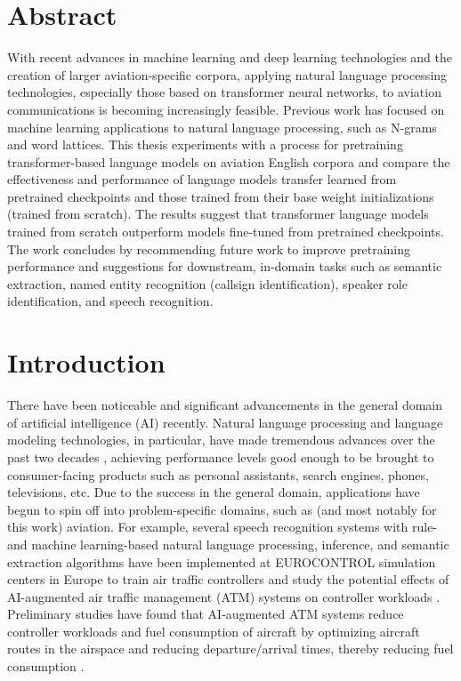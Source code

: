 \documentclass[12pt]{article}
\begin{document}
\section{Abstract}\label{sec:abstract}
With recent advances in machine learning and deep learning technologies and the creation of larger aviation-specific corpora, applying
natural language processing technologies, especially those based on transformer neural networks, to aviation communications is becoming
increasingly feasible. Previous work has focused on machine learning applications to natural language processing, such as N-grams and
word lattices. This thesis experiments with a process for pretraining transformer-based language models on aviation English corpora and
compare the effectiveness and performance of language models transfer learned from pretrained checkpoints and those trained from their
base weight initializations (trained from scratch). The results suggest that transformer language models trained from scratch outperform
models fine-tuned from pretrained checkpoints. The work concludes by recommending future work to improve pretraining performance and
suggestions for downstream, in-domain tasks such as semantic extraction, named entity recognition (callsign identification), speaker
role identification, and speech recognition.

\section{Introduction}\label{sec:introduction}
There have been noticeable and significant advancements in the general domain of artificial intelligence (AI) recently. Natural
language processing and language modeling technologies, in particular, have made tremendous advances over the past two decades
\cite{hannun_deep_2014,lee_unsupervised_2009,li_jasper_2019,kriman_quartznet_2020}, achieving performance levels good enough to be brought to
consumer-facing products such as personal assistants, search engines, phones, televisions, etc. Due to the success in the general domain, applications
have begun to spin off into problem-specific domains, such as (and most notably for this work) aviation. For example, several speech recognition
systems with rule- and machine learning-based natural language processing, inference, and semantic extraction algorithms have been implemented at
EUROCONTROL simulation centers in Europe to train air traffic controllers and study the potential effects of AI-augmented air traffic management (ATM)
systems on controller workloads \cite{helmke_quantifying_2017,helmke_assistant-based_2015}. Preliminary studies have found that AI-augmented ATM
systems reduce controller workloads and fuel consumption of aircraft by optimizing aircraft routes in the airspace and reducing departure/arrival
times, thereby reducing fuel consumption \cite{helmke_quantifying_2017}.
\end{document}
